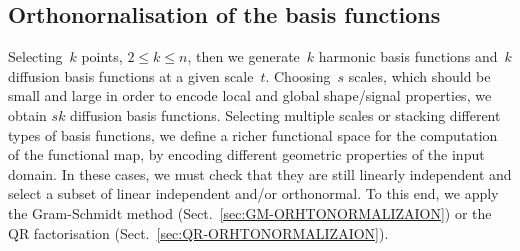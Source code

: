 \documentclass[acmtog,authorversion]{acmart}
\begin{document}
\subsection{Orthonornalisation of the basis functions\label{sec:ORTHONOTMALIZATION-PROCESS}}
Selecting~$k$ points, \mbox{$2\leq k\leq n$}, then we generate~$k$ harmonic basis functions and~$k$ diffusion basis functions at a given scale~$t$. Choosing~$s$ scales, which should be small and large in order to encode local and global shape/signal properties, we obtain \mbox{$sk$} diffusion basis functions. Selecting multiple scales or stacking different types of basis functions, we define a richer functional space for the computation of the functional map, by encoding different geometric properties of the input domain. In these cases, we must check that they are still linearly independent and select a subset of linear independent and/or orthonormal. To this end, we apply the Gram-Schmidt method (Sect.~\ref{sec:GM-ORHTONORMALIZAION}) or the QR factorisation (Sect.~\ref{sec:QR-ORHTONORMALIZAION}).
\end{document}
